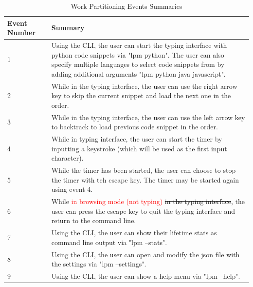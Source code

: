 \documentclass[12pt, titlepage]{article}
\begin{document}
\begin{table}[h]
    \centering
    \begin{tabular}{| p{0.18\linewidth} | p{0.82\linewidth} |}
        \hline
        Event Number & Summary \\
        \hline
        1 & Using the CLI, the user can start the typing interface with python code snippets via "lpm python". The user can also specify multiple languages to select code snippets from by adding additional arguments "lpm python java javascript".\\
        \hline
        2 & While in the typing interface, the user can use the right arrow key to skip the current snippet and load the next one in the order.\\
        \hline
        3 & While in the typing interface, the user can use the left arrow key to backtrack to load previous code snippet in the order.\\
        \hline
        4 & While in typing interface, the user can start the timer by inputting a keystroke (which will be used as the first input character).\\
        \hline
        5 & While the timer has been started, the user can choose to stop the timer with teh escape key. The timer may be started again using event 4.\\
        \hline
        6 & While \textcolor{red}{in browsing mode (not typing)} \sout{in the typing interface}, the user can press the escape key to quit the typing interface and return to the command line.\\
        \hline
        7 & Using the CLI, the user can show their lifetime stats as command line output via "lpm --stats".\\
        \hline
        8 & Using the CLI, the user can open and modify the json file with the settings via "lpm --settings".\\
        \hline
        9 & Using the CLI, the user can show a help menu via "lpm --help".\\
        \hline
    \end{tabular}
    \caption{Work Partitioning Events Summaries}
    \label{tab:workpartsummary}
\end{table}

\newpage
\end{document}
